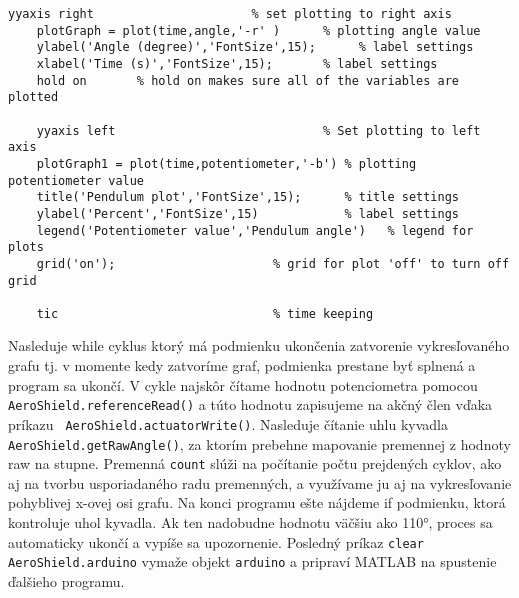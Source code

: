 \begin{lstlisting}[caption={AeroShield open loop grafy.},captionpos=b]
	yyaxis right                      % set plotting to right axis 
	plotGraph = plot(time,angle,'-r' )      % plotting angle value
	ylabel('Angle (degree)','FontSize',15);      % label settings
	xlabel('Time (s)','FontSize',15);       % label settings
	hold on       % hold on makes sure all of the variables are plotted
	
	yyaxis left                             % Set plotting to left axis
	plotGraph1 = plot(time,potentiometer,'-b') % plotting potentiometer value
	title('Pendulum plot','FontSize',15);      % title settings   
	ylabel('Percent','FontSize',15)            % label settings
	legend('Potentiometer value','Pendulum angle')   % legend for plots
	grid('on');                      % grid for plot 'off' to turn off grid
	
	tic                              % time keeping
\end{lstlisting}

Nasleduje while cyklus ktorý má podmienku ukončenia zatvorenie vykresľovaného grafu tj. v momente kedy zatvoríme graf, podmienka prestane byť splnená a program sa ukončí. V cykle najskôr čítame hodnotu potenciometra pomocou \verb|AeroShield.referenceRead()| a túto hodnotu zapisujeme na akčný člen vďaka príkazu \verb| AeroShield.actuatorWrite()|. Nasleduje čítanie uhlu kyvadla \verb|AeroShield.getRawAngle()|, za ktorím prebehne mapovanie premennej z hodnoty raw na stupne. Premenná \verb|count| slúži na počítanie počtu prejdených cyklov, ako aj na tvorbu usporiadaného radu premenných, a využívame ju aj na vykresľovanie pohyblivej x-ovej osi grafu. Na konci programu ešte nájdeme if podmienku, ktorá kontroluje uhol kyvadla. Ak ten nadobudne hodnotu väčšiu ako 110°, proces sa automaticky ukončí a vypíše sa upozornenie. Posledný príkaz \verb|clear AeroShield.arduino| vymaže objekt \verb|arduino| a pripraví MATLAB na spustenie ďalšieho programu. 

